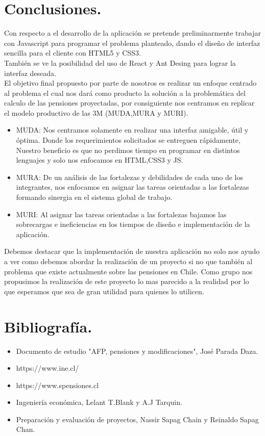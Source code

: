 \documentclass{udpreport}
\begin{document}
\chapter{Conclusiones.}
Con respecto a el desarrollo de la aplicación se pretende preliminarmente trabajar con Javascript para programar el problema planteado, dando el diseño de interfaz sencilla para el cliente con HTML5 y CSS3. 
\\
También se ve la posibilidad del uso de React y Ant Desing para lograr la interfaz deseada.
\\
El objetivo final propuesto por parte de nosotros es realizar un enfoque centrado al problema el cual nos dará como producto la solución a la problemática del calculo de las pensiones proyectadas, por consiguiente nos centramos en replicar el modelo productivo de las 3M (MUDA,MURA y MURI).
\begin{itemize}
    \item MUDA: Nos centramos solamente en realizar una interfaz amigable, útil y óptima. Donde los requerimientos solicitados se entreguen rápidamente, Nuestro beneficio es que no perdimos tiempo en programar en distintos lenguajes y solo nos enfocamos en HTML,CSS3 y JS.
    \item MURA: De un análisis de las fortalezas y debilidades de cada uno de los integrantes, nos enfocamos en asignar las tareas orientadas a las fortalezas formando sinergia en el sistema global de trabajo.
    \item MURI: Al asignar las tareas orientadas a las fortalezas bajamos las sobrecargas e ineficiencias en los tiempos de diseño e implementación de la aplicación.
\end{itemize}
Debemos destacar que la implementación de nuestra aplicación no solo nos ayudo a ver como debemos abordar la realización de un proyecto si no que también al problema que existe actualmente sobre las pensiones en Chile. Como grupo nos propusimos la realización de este proyecto lo mas parecido a la realidad por lo que esperamos que sea de gran utilidad para quienes lo utilicen.

\chapter{Bibliografía.}
\begin{itemize}
    \item Documento de estudio "AFP, pensiones y modificaciones", José Parada Daza.
    \item https://www.ine.cl/
    \item https://www.spensiones.cl
    \item Ingeniería económica, Lelant T.Blank y A.J Tarquin.
    \item Preparación y evaluación de proyectos, Nassir Sapag Chain y Reinaldo Sapag Chan.
\end{itemize}
\end{document}
